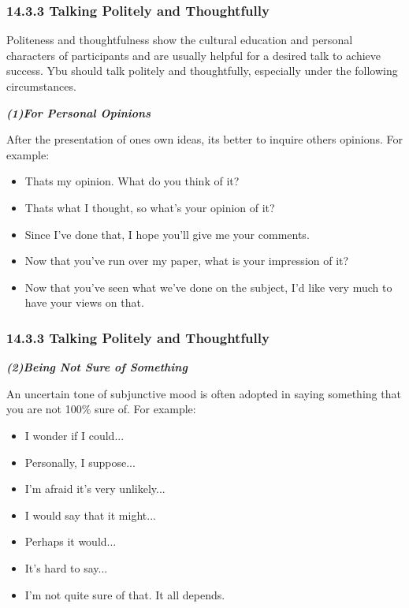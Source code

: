 \documentclass[aspectratio=169,UTF8,c]{beamer}%
\begin{document}
\begin{frame}
	\frametitle{14.3.3 Talking Politely and Thoughtfully}
	Politeness and thoughtfulness show the cultural education and personal characters of participants and are usually helpful for a desired talk to achieve success. Ybu should talk politely and thoughtfully, especially under the following circumstances.
	
	\emph{\textbf{(1)For Personal Opinions}}
	
	After the presentation of ones own ideas, its better to inquire others opinions. For example:
	\begin{itemize}
		\item Thats my opinion. What do you think of it?
		\item Thats what I thought, so what's your opinion of it?
		\item Since I've done that, I hope you'll give me your comments.
		\item Now that you've run over my paper, what is your impression of it?
		\item Now that you've seen what we've done on the subject, I'd like very much to have your views on that.
	\end{itemize}
\end{frame}
\begin{frame}
	\frametitle{14.3.3 Talking Politely and Thoughtfully}
	\emph{\textbf{(2)Being Not Sure of Something}}
	
	An uncertain tone of subjunctive mood is often adopted in saying something that you are not 100\% sure of. For example:
	\begin{itemize}
		\item I wonder if I could...
		\item Personally, I suppose...
		\item I'm afraid it's very unlikely...
		\item I would say that it might...
		\item Perhaps it would...
		\item It's hard to say...
		\item I'm not quite sure of that. It all depends.
	\end{itemize}
\end{frame}
\end{document}
